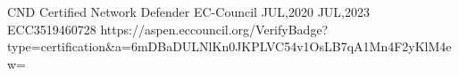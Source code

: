 
\begin{cvcerts}

  \cvcert
    {CND} %
    {Certified Network Defender} %
    {EC-Council} %
    {JUL,2020} %
    {JUL,2023} %
    {ECC3519460728} %
    {https://aspen.eccouncil.org/VerifyBadge?type=certification&a=6mDBaDULNlKn0JKPLVC54v1OsLB7qA1Mn4F2yKlM4ew=} %
\end{cvcerts}